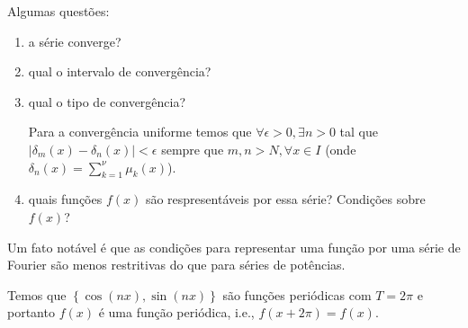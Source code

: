 Algumas questões:
\begin{enumerate}
  \item a série converge?
  \item qual o intervalo de convergência?
  \item qual o tipo de convergência?
    \begin{exem}
      Para a convergência uniforme temos que $\forall \epsilon > 0, \exists
      n > 0$ tal que $| \delta_m(x) - \delta_n(x)| < \epsilon$ sempre que $m, n
      > N, \forall x \in I$ (onde $\delta_n(x) = \sum_{k = 1}^\nu \mu_k(x)$).
    \end{exem}
  \item quais funções $f(x)$ são respresentáveis por essa série? Condições sobre
    $f(x)$?
\end{enumerate}

Um fato notável é que as condições para representar uma função por uma série de
Fourier são menos restritivas do que para séries de potências.

\begin{obs}
  Temos que $\left\{ \cos\left( n x \right), \sin\left( n x \right) \right\}$
  são funções periódicas com $T = 2\pi$ e portanto $f(x)$ é uma função
  periódica, i.e., $f(x + 2\pi) = f(x)$.
\end{obs}

